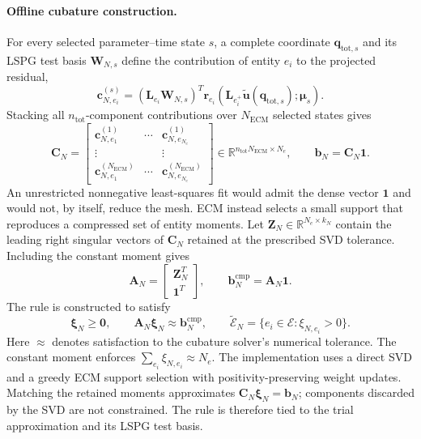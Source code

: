 \documentclass[11pt]{article}
\newcommand{\utilde}{\widetilde{\mathbf u}}
\newcommand{\mub}{\bm\mu}
\begin{document}
\paragraph{Offline cubature construction.}
For every selected parameter--time state $s$, a complete coordinate
$\mathbf q_{\mathrm{tot},s}$ and its LSPG test basis $\mathbf W_{N,s}$ define the contribution
of entity $e_i$ to the projected residual,
\begin{equation}
\mathbf c_{N,e_i}^{(s)}=(\mathbf L_{e_i}\mathbf W_{N,s})^T
\mathbf r_{e_i}(\mathbf L_{e_i^+}\utilde(
\mathbf q_{\mathrm{tot},s});\mub_s).
\label{eq:linear-ecm-contribution}
\end{equation}
Stacking all $n_{\mathrm{tot}}$-component contributions over
$N_{\mathrm{ECM}}$ selected states gives
\begin{equation}
\mathbf C_N=
\begin{bmatrix}
\mathbf c_{N,e_1}^{(1)} & \cdots & \mathbf c_{N,e_{N_e}}^{(1)}\\
\vdots & & \vdots\\
\mathbf c_{N,e_1}^{(N_{\mathrm{ECM}})} & \cdots &
\mathbf c_{N,e_{N_e}}^{(N_{\mathrm{ECM}})}
\end{bmatrix}
\in\mathbb R^{n_{\mathrm{tot}}N_{\mathrm{ECM}}\times N_e},
\qquad \mathbf b_N=\mathbf C_N\mathbf1.
\label{eq:linear-ecm-training-matrix}
\end{equation}
An unrestricted nonnegative least-squares fit would admit the dense vector
$\mathbf1$ and would not, by itself, reduce the mesh.
ECM instead selects a small support that reproduces a compressed set of
entity moments.  Let $\mathbf Z_N\in\mathbb R^{N_e\times k_N}$ contain
the leading right singular vectors of $\mathbf C_N$ retained at the
prescribed SVD tolerance.  Including the constant moment gives
\begin{equation}
\mathbf A_N=
\begin{bmatrix}\mathbf Z_N^T\\ \mathbf1^T\end{bmatrix},
\qquad
\mathbf b_N^{\mathrm{cmp}}=\mathbf A_N\mathbf1.
\label{eq:linear-ecm-compressed-moments}
\end{equation}
The rule is constructed to satisfy
\begin{equation}
\boldsymbol\xi_N\geq\mathbf0,\qquad
\mathbf A_N\boldsymbol\xi_N\approx\mathbf b_N^{\mathrm{cmp}},\qquad
\widetilde{\mathcal E}_N=\{e_i\in\mathcal E:\xi_{N,e_i}>0\}.
\label{eq:linear-ecm}
\end{equation}
Here $\approx$ denotes satisfaction to the cubature solver's numerical
tolerance.  The constant moment enforces
$\sum_{e_i}\xi_{N,e_i}\approx N_e$.
The implementation uses a direct SVD and a greedy ECM support selection
with positivity-preserving weight updates.  Matching the retained moments
approximates $\mathbf C_N\boldsymbol\xi_N=\mathbf b_N$; components
discarded by the SVD are not constrained.  The rule is therefore tied to
the trial approximation and its LSPG test basis.
\end{document}
